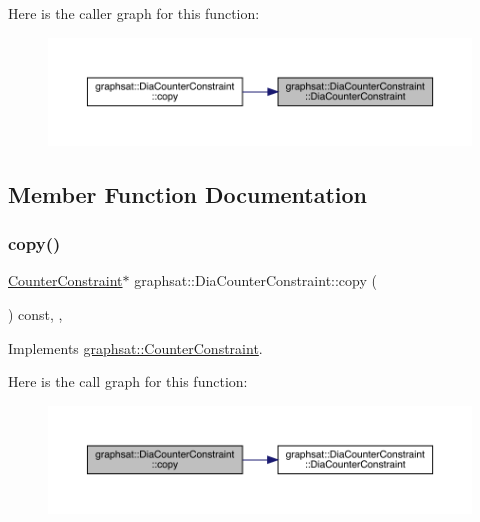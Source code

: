 Here is the caller graph for this function\+:
\nopagebreak
\begin{figure}[H]
\begin{center}
\leavevmode
\includegraphics[width=350pt]{classgraphsat_1_1_dia_counter_constraint_a16aa92c2e28e0a3e5e110f413a9a3035_icgraph}
\end{center}
\end{figure}


\subsection{Member Function Documentation}
\mbox{\label{classgraphsat_1_1_dia_counter_constraint_a8298e206d438c302fa43a568bec517ae}} 
\subsubsection{\texorpdfstring{copy()}{copy()}}
{\footnotesize\ttfamily \mbox{\hyperlink{classgraphsat_1_1_counter_constraint}{Counter\+Constraint}}$\ast$ graphsat\+::\+Dia\+Counter\+Constraint\+::copy (\begin{DoxyParamCaption}{ }\end{DoxyParamCaption}) const\hspace{0.3cm}{\ttfamily [inline]}, {\ttfamily [private]}, {\ttfamily [virtual]}}



Implements \mbox{\hyperlink{classgraphsat_1_1_counter_constraint_a880eb6520fcf80de35071d62cb31a640}{graphsat\+::\+Counter\+Constraint}}.

Here is the call graph for this function\+:
\nopagebreak
\begin{figure}[H]
\begin{center}
\leavevmode
\includegraphics[width=350pt]{classgraphsat_1_1_dia_counter_constraint_a8298e206d438c302fa43a568bec517ae_cgraph}
\end{center}
\end{figure}
\mbox{\label{classgraphsat_1_1_dia_counter_constraint_a75319d3a2b1cf2db7cf540b732729871}} 
